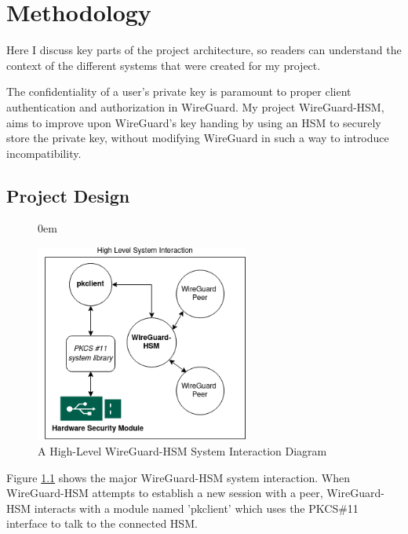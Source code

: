 \documentclass [11pt, proquest] {uwthesis}[2020/02/24]
\begin{document}
\chapter {Methodology}
Here I discuss key parts of the project architecture, so readers can understand the context of the different systems that were created for my project.

The confidentiality of a user's private key is paramount to proper client authentication and authorization in WireGuard. My project WireGuard-HSM, aims to improve upon WireGuard's key handing by using an HSM to securely store the private key, without modifying WireGuard in such a way to introduce incompatibility.

\section{Project Design}
\begin{figure}
\itemsep0em 
\begin{center}
\includegraphics[width=7cm]{paper/images/high-level-overview.png}
\caption{A High-Level WireGuard-HSM System Interaction Diagram}
\label{fig:highlevel_system}
\end{center}
\end{figure}
Figure \ref{fig:highlevel_system} shows the major WireGuard-HSM system interaction. When WireGuard-HSM attempts to establish a new session with a peer, WireGuard-HSM interacts with a module named 'pkclient' which uses the PKCS\#11 interface to talk to the connected HSM. 
\end{document}
